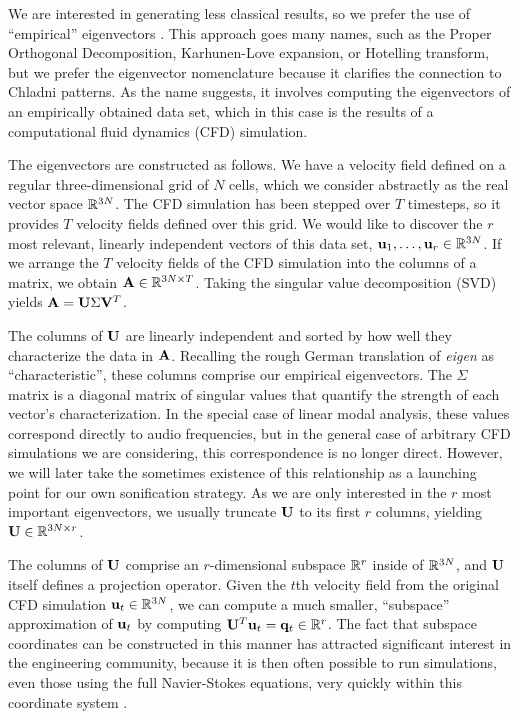\documentclass[11pt]{article}
\begin{document}
We are interested in generating less classical results, so we prefer the use of ``empirical'' eigenvectors \cite{Ryckelynck2005}. This approach goes many names, such as the Proper Orthogonal Decomposition, Karhunen-Love expansion, or Hotelling transform, but we prefer the eigenvector nomenclature because it clarifies the connection to Chladni patterns. As the name suggests, it involves computing the eigenvectors of an empirically obtained data set, which in this case is the results of a computational fluid dynamics (CFD) simulation.

The eigenvectors are constructed as follows. We have a velocity field defined on a regular three-dimensional grid of $N$ cells, which we consider abstractly as the real vector space $\mathbb{R}^{3N}$. The CFD simulation has been stepped over $T$ timesteps, so it provides $T$ velocity fields defined over this grid. We would like to discover the $r$ most relevant, linearly independent vectors of this data set, $\mathbf{u}_1, \ldots, \mathbf{u}_r \in \mathbb{R}^{3N}$. If we arrange the $T$ velocity fields of the CFD simulation into the columns of a matrix, we obtain $\mathbf{A} \in \mathbb{R}^{3N \times T}$. Taking the singular value decomposition (SVD) yields $\mathbf{A} = \mathbf{U} \Sigma \mathbf{V}^T$.

The columns of $\mathbf{U}$ are linearly independent and sorted by how well they characterize the data in $\mathbf{A}$. Recalling the rough German translation of {\em eigen} as ``characteristic'', these columns comprise our empirical eigenvectors. The $\Sigma$ matrix is a diagonal matrix of singular values that quantify the strength of each vector's characterization. In the special case of linear modal analysis, these values correspond directly to audio frequencies, but in the general case of arbitrary CFD simulations we are considering, this correspondence is no longer direct. However, we will later take the sometimes existence of this relationship as a launching point for our own sonification strategy. As we are only interested in the $r$ most important eigenvectors, we usually truncate $\mathbf{U}$ to its first $r$ columns, yielding $\mathbf{U} \in \mathbb{R}^{3N \times r}$.

The columns of $\mathbf{U}$ comprise an $r$-dimensional subspace $\mathbb{R}^r$ inside of $\mathbb{R}^{3N}$, and $\mathbf{U}$ itself defines a projection operator. Given the $t$th velocity field from the original CFD simulation $\mathbf{u}_t \in \mathbb{R}^{3N}$, we can compute a much smaller, ``subspace'' approximation of $\mathbf{u}_t$ by computing $\mathbf{U}^T \mathbf{u}_t = \mathbf{q}_t \in \mathbb{R}^r$. The fact that subspace coordinates can be constructed in this manner has attracted significant interest in the engineering community, because it is then often possible to run simulations, even those using the full Navier-Stokes equations, very quickly within this coordinate system \cite{Kim2013}.
\end{document}

